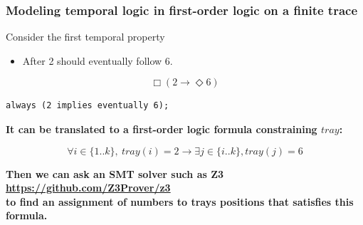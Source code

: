 \begin{frame}[fragile]
  \frametitle{Modeling temporal logic in first-order logic on a finite trace} \small

\begin{block}{Consider the first temporal property}\scriptsize
\begin{itemize}
\item After 2 should eventually follow 6. 
\end{itemize}

\[
\Box (2 \rightarrow \Diamond 6)
\]

\begin{lstlisting}[language=tasknetdsl,frame=single]
                        always (2 implies eventually 6);
\end{lstlisting}

\end{block}

\pause

\vspace{0.2cm}
{\bf It can be translated to a first-order logic formula constraining $tray$:}

\[
\forall i \in \{1..k\},\ tray(i) = 2 
  \rightarrow 
    \exists j \in \{i..k\}, tray(j) = 6
\]

\pause

\vspace{0.2cm}
{\bf Then we can ask an SMT solver such as Z3\\ 
\url{https://github.com/Z3Prover/z3}\\ 
to find an assignment of numbers to trays positions that satisfies this formula.}

\end{frame}